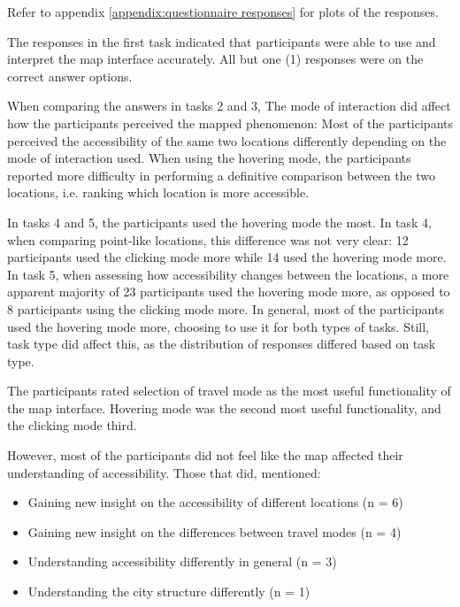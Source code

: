 Refer to appendix \ref{appendix:questionnaire responses} for plots of the responses.

The responses in the first task indicated that participants were
able to use and interpret the map interface accurately.
All but one (1) responses
were on the correct answer options.

When comparing the answers in tasks 2 and 3,
The mode of interaction did affect how the participants perceived the mapped phenomenon:
Most of the participants perceived
the accessibility of the same two locations
differently depending on the mode of interaction used.
When using the hovering mode, the participants reported more difficulty in
performing a definitive comparison between the two locations,
i.e. ranking which location is more accessible.

In tasks 4 and 5,
the participants used the hovering mode the most.
In task 4, when comparing point-like locations,
this difference was not very clear:
12 participants used the clicking mode more while 14 used the hovering mode more.
In task 5, when assessing how accessibility changes between the locations,
a more apparent majority of 23 participants used the hovering mode more,
as opposed to 8 participants using the clicking mode more.
In general,
most of the participants used the hovering mode more,
choosing to use it for both types of tasks.
Still,
task type did affect this,
as the distribution of responses differed based on task type.

The participants rated selection of travel mode as the most useful functionality of
the map interface.
Hovering mode was the second most useful functionality,
and the clicking mode third.

However, most of the participants did not feel like the map affected
their understanding of accessibility.
Those that did, mentioned:

\begin{itemize}
	\item Gaining new insight on the accessibility of different locations (n = 6)
	\item Gaining new insight on the differences between travel modes (n = 4)
	\item Understanding accessibility differently in general (n = 3)
	\item Understanding the city structure differently (n = 1)
\end{itemize}

